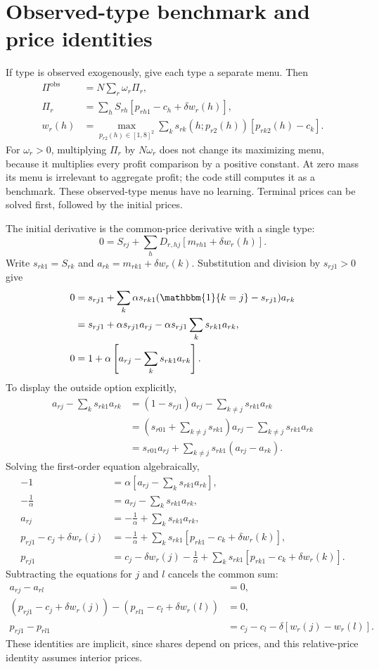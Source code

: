 \documentclass[12pt]{article}
\theoremstyle{definition}
\theoremstyle{remark}
\newcommand{\ind}{\mathbbm{1}}
\numberwithin{equation}{section}
\begin{document}
\section{Observed-type benchmark and price identities}
If type is observed exogenously, give each type a separate menu. Then
\begin{align}
 \Pi^{\mathrm{obs}}&=N\sum_r\omega_r\Pi_r,\\
 \Pi_r&=\sum_hS_{rh}[p_{rh1}-c_h+\delta w_r(h)],\\
 w_r(h)&=\max_{p_{r2}(h)\in[1,8]^2}
               \sum_ks_{rk}(h;p_{r2}(h))[p_{rk2}(h)-c_k].
\end{align}
For $\omega_r>0$, multiplying $\Pi_r$ by $N\omega_r$ does not change its
maximizing menu, because it multiplies every profit comparison by a positive
constant. At zero mass its menu is irrelevant to aggregate profit; the code
still computes it as a benchmark. These observed-type menus have no learning.
Terminal prices can be solved first, followed by the initial prices.

The initial derivative is the common-price derivative with a single type:
\[
 0=S_{rj}+\sum_hD_{r,hj}[m_{rh1}+\delta w_r(h)].
\]
Write $s_{rk1}=S_{rk}$ and
$a_{rk}=m_{rk1}+\delta w_r(k)$. Substitution and division by $s_{rj1}>0$ give
\begin{align}
 0&=s_{rj1}+\sum_k\alpha s_{rk1}(\ind\{k=j\}-s_{rj1})a_{rk}\\
 &=s_{rj1}+\alpha s_{rj1}a_{rj}
                         -\alpha s_{rj1}\sum_ks_{rk1}a_{rk},\\
 0&=1+\alpha\left[a_{rj}-\sum_ks_{rk1}a_{rk}\right].
\end{align}
To display the outside option explicitly,
\begin{align}
 a_{rj}-\sum_ks_{rk1}a_{rk}
 &=(1-s_{rj1})a_{rj}-\sum_{k\ne j}s_{rk1}a_{rk}\\
 &=\left(s_{r01}+\sum_{k\ne j}s_{rk1}\right)a_{rj}
                              -\sum_{k\ne j}s_{rk1}a_{rk}\\
 &=s_{r01}a_{rj}+\sum_{k\ne j}s_{rk1}(a_{rj}-a_{rk}).
\end{align}
Solving the first-order equation algebraically,
\begin{align}
 -1&=\alpha\left[a_{rj}-\sum_ks_{rk1}a_{rk}\right],\\
 -\frac1\alpha&=a_{rj}-\sum_ks_{rk1}a_{rk},\\
 a_{rj}&=-\frac1\alpha+\sum_ks_{rk1}a_{rk},\\
 p_{rj1}-c_j+\delta w_r(j)
 &=-\frac1\alpha+\sum_ks_{rk1}[p_{rk1}-c_k+\delta w_r(k)],\\
 p_{rj1}&=c_j-\delta w_r(j)-\frac1\alpha
                  +\sum_ks_{rk1}[p_{rk1}-c_k+\delta w_r(k)].
\end{align}
Subtracting the equations for $j$ and $l$ cancels the common sum:
\begin{align}
 a_{rj}-a_{rl}&=0,\\
 (p_{rj1}-c_j+\delta w_r(j))-(p_{rl1}-c_l+\delta w_r(l))&=0,\\
 p_{rj1}-p_{rl1}&=c_j-c_l-\delta[w_r(j)-w_r(l)].
\end{align}
These identities are implicit, since shares depend on prices, and this
relative-price identity assumes interior prices.
\end{document}
